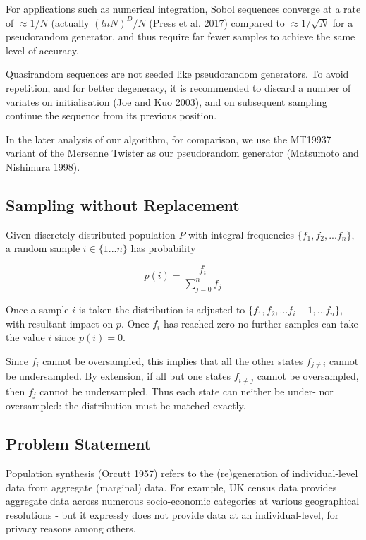 \documentclass[]{article}
\begin{document}
For applications such as numerical integration, Sobol sequences converge
at a rate of \(\approx1/N\) (actually \((ln N)^D/N\) (Press et al. 2017)
compared to \(\approx1/\sqrt N\) for a pseudorandom generator, and thus
require far fewer samples to achieve the same level of accuracy.

Quasirandom sequences are not seeded like pseudorandom generators. To
avoid repetition, and for better degeneracy, it is recommended to
discard a number of variates on initialisation (Joe and Kuo 2003), and
on subsequent sampling continue the sequence from its previous position.

In the later analysis of our algorithm, for comparison, we use the
MT19937 variant of the Mersenne Twister as our pseudorandom generator
(Matsumoto and Nishimura 1998).

\subsection{Sampling without
Replacement}\label{sampling-without-replacement}

Given discretely distributed population \(P\) with integral frequencies
\(\{f_1,f_2,...f_n\}\), a random sample \(i \in \{1...n\}\) has
probability

\[p(i) = \frac{f_i}{\sum\limits_{j=0}^{n}f_j}\]

Once a sample \(i\) is taken the distribution is adjusted to
\(\{f_1,f_2,...f_i-1,...f_n\}\), with resultant impact on \(p\). Once
\(f_i\) has reached zero no further samples can take the value \(i\)
since \(p(i) = 0\).

Since \(f_i\) cannot be oversampled, this implies that all the other
states \(f_{j\neq{i}}\) cannot be undersampled. By extension, if all but
one states \(f_{i\neq{j}}\) cannot be oversampled, then \(f_j\) cannot
be undersampled. Thus each state can neither be under- nor oversampled:
the distribution must be matched exactly.

\subsection{Problem Statement}\label{problem-statement}

Population synthesis (Orcutt 1957) refers to the (re)generation of
individual-level data from aggregate (marginal) data. For example, UK
census data provides aggregate data across numerous socio-economic
categories at various geographical resolutions - but it expressly does
not provide data at an individual-level, for privacy reasons among
others.
\end{document}
